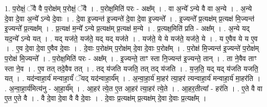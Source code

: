 \documentclass[17pt]{extarticle}
\begin{document}
1. प॒रोक्षं॒ ॅवै वै प॒रोक्ष॑म् प॒रोक्षं॒ ॅवै । . प॒रोक्ष॒मिति॑ परः - अक्ष᳚म् । . वा अ॒न्ये᳚ ऽन्ये वै वा अ॒न्ये । . अ॒न्ये दे॒वा दे॒वा अ॒न्ये᳚ ऽन्ये दे॒वाः । . दे॒वा इ॒ज्यन्त॑ इ॒ज्यन्ते॑ दे॒वा दे॒वा इ॒ज्यन्ते᳚ । . इ॒ज्यन्ते᳚ प्र॒त्यक्ष॑म् प्र॒त्यक्ष॑ मि॒ज्यन्त॑ इ॒ज्यन्ते᳚ प्र॒त्यक्ष᳚म् । . प्र॒त्यक्ष॑ म॒न्ये᳚ ऽन्ये प्र॒त्यक्ष॑म् प्र॒त्यक्ष॑ म॒न्ये । . प्र॒त्यक्ष॒मिति॑ प्रति - अक्ष᳚म् । . अ॒न्ये यद् यद॒न्ये᳚ ऽन्ये यत् । . यद् यज॑ते॒ यज॑ते॒ यद् यद् यज॑ते । . यज॑ते॒ ये ये यज॑ते॒ यज॑ते॒ ये । . य ए॒वैव ये य ए॒व । . ए॒व दे॒वा दे॒वा ए॒वैव दे॒वाः । . दे॒वाः प॒रोक्ष॑म् प॒रोक्ष॑म् दे॒वा दे॒वाः प॒रोक्ष᳚म् । . प॒रोक्ष॑ मि॒ज्यन्त॑ इ॒ज्यन्ते॑ प॒रोक्ष॑म् प॒रोक्ष॑ मि॒ज्यन्ते᳚ । . प॒रोक्ष॒मिति॑ परः - अक्ष᳚म् । . इ॒ज्यन्ते॒ ताꣳ स्ता नि॒ज्यन्त॑ इ॒ज्यन्ते॒ तान् । . ता ने॒वैव ताꣳ स्ता ने॒व । . ए॒व तत् तदे॒वैव तत् । . तद् य॑जति यजति॒ तत् तद् य॑जति । . य॒ज॒ति॒ यद् यद् य॑जति यजति॒ यत् । . यद॑न्वाहा॒र्य॑ मन्वाहा॒र्यं॑ ॅयद् यद॑न्वाहा॒र्य᳚म् । . अ॒न्वा॒हा॒र्य॑ मा॒हर॑ त्या॒हर॑ त्यन्वाहा॒र्य॑ मन्वाहा॒र्य॑ मा॒हर॑ति । . अ॒न्वा॒हा॒र्य॑मित्य॑नु - आ॒हा॒र्य᳚म् । . आ॒हर॑ त्ये॒त ए॒त आ॒हर॑ त्या॒हर॑ त्ये॒ते । . आ॒हर॒तीत्या᳚ - हर॑ति । . ए॒ते वै वा ए॒त ए॒ते वै । . वै दे॒वा दे॒वा वै वै दे॒वाः । . दे॒वाः प्र॒त्यक्ष॑म् प्र॒त्यक्ष॑म् दे॒वा दे॒वाः प्र॒त्यक्ष᳚म् । \newline
\end{document}

